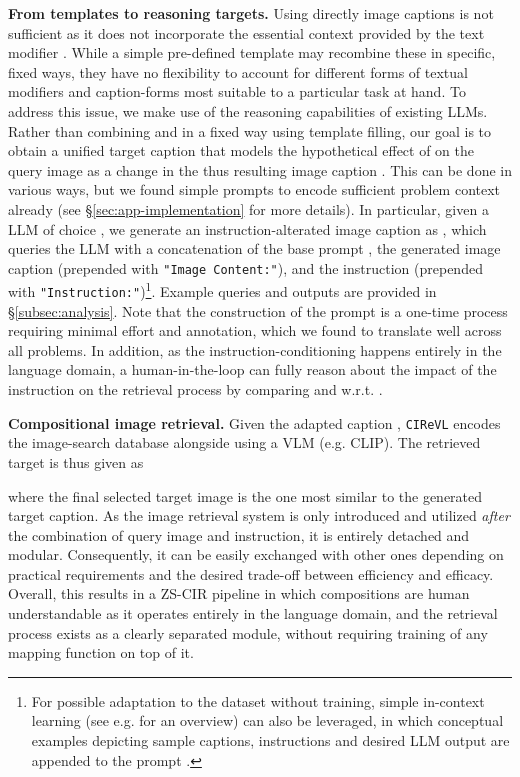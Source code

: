 \documentclass{article} \usepackage{iclr2024_conference,times}
\newcommand{\methodName}{\texttt{CIReVL}\xspace} \newcommand{\methodNameNS}{\texttt{CIReVL}}
\begin{document}
\textbf{From templates to reasoning targets.} Using directly image captions  is not sufficient as it does not incorporate the essential context provided by the text modifier . While a simple pre-defined template may recombine these in specific, fixed ways, they have no flexibility to account for different forms of textual modifiers and caption-forms most suitable to a particular task at hand. To address this issue, we make use of the reasoning capabilities of existing LLMs. Rather than combining  and  in a fixed way using template filling, our goal is to obtain a unified target caption that models the hypothetical effect of  on the query image  as a change in the thus resulting image caption .
This can be done in various ways, but we found simple prompts  to encode sufficient problem context already (see \S\ref{sec:app-implementation} for more details). 
In particular, given a LLM of choice , we generate an instruction-alterated image caption as , which queries the LLM with a concatenation of the base prompt , the generated image caption  (prepended with \texttt{"Image Content:"}), and the instruction  (prepended with \texttt{"Instruction:"})\footnote{For possible adaptation to the dataset without training, simple in-context learning (see e.g. \cite{dong2023survey} for an overview) can also be leveraged, in which conceptual examples depicting sample captions, instructions and desired LLM output are appended to the prompt .}. Example queries and outputs are provided in \S\ref{subsec:analysis}. 
Note that the construction of the prompt is a one-time process requiring minimal effort and annotation, which we found to translate well across all problems. In addition, as the instruction-conditioning happens entirely in the language domain, a human-in-the-loop can fully reason about the impact of the instruction on the retrieval process by comparing  and  w.r.t. .

\textbf{Compositional image retrieval.}
Given the adapted caption , \methodName encodes the image-search database  alongside  using a VLM (e.g. CLIP). The retrieved target  is thus given as

where the final selected target image is the one most similar to the generated target caption. As the image retrieval system is only introduced and utilized \textit{after} the combination of query image and instruction, it is entirely detached and modular. Consequently, it can be easily exchanged with other ones depending on practical requirements and the desired trade-off between efficiency and efficacy.
Overall, this results in a ZS-CIR pipeline in which compositions are human understandable as it operates entirely in the language domain, and the retrieval process exists as a clearly separated module, without requiring training of any mapping function on top of it.
\end{document}
